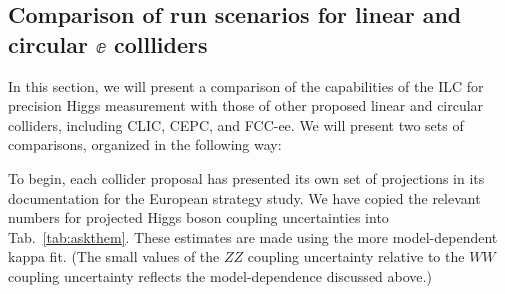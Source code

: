 

\subsection{Comparison of run scenarios for linear and circular $\ee$ collliders}
\label{subsec:lincirc}



In this section, we will present a comparison of the capabilities of
the ILC for precision Higgs measurement with those of other proposed
linear and circular colliders, including CLIC, CEPC, and FCC-ee.  We
will present two sets of comparisons, organized in the 
following way:

To begin, each collider proposal has presented its own set of
projections in its documentation for the European strategy study.   We
have copied the relevant numbers for projected Higgs boson coupling
uncertainties into Tab.~\ref{tab:askthem}. 
 These estimates are made using the more model-dependent
 kappa fit.   (The small values of the $ZZ$ coupling uncertainty relative to the $WW$ coupling uncertainty reflects the model-dependence discussed above.)


